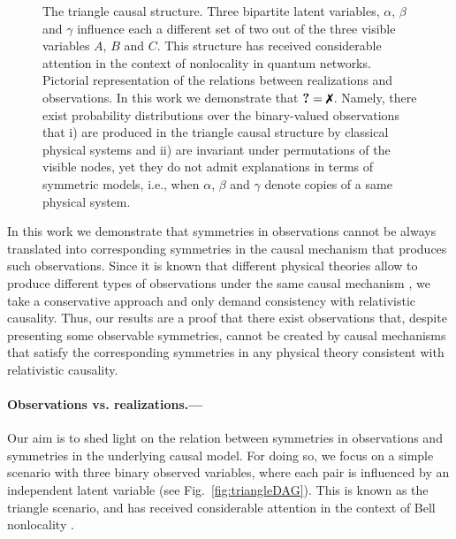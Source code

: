 \documentclass[aps,physrev,reprint,superscriptaddress,nofootinbib,twocolumn]{revtex4-2}
\newcommand{\vmark}{\text{\ding{51}}}
\newcommand{\xmark}{\text{\ding{55}}}
\begin{document}
\begin{figure}
{{
        }
    }
    \caption{
        \protect{} The triangle causal structure.
        Three bipartite latent variables, $\alpha$, $\beta$ and $\gamma$ influence each a different set of two out of the three visible variables $A$, $B$ and $C$.
        This structure has received considerable attention in the context of nonlocality in quantum networks.
        \protect{} Pictorial representation of the relations between realizations and observations.
        In this work we demonstrate that $\textbf{?}=\xmark$.
        Namely, there exist probability distributions over the binary-valued observations that i) are produced in the triangle causal structure by classical physical systems and ii) are invariant under permutations of the visible nodes, yet they do not admit explanations in terms of symmetric models, i.e., when $\alpha$, $\beta$ and $\gamma$ denote copies of a same physical system. 
        }
    \label{fig:intro}
\end{figure}

In this work we demonstrate that symmetries in observations cannot be always translated into corresponding symmetries in the causal mechanism that produces such observations.
Since it is known that different physical theories allow to produce different types of observations under the same causal mechanism \cite{bell1964}, we take a conservative approach and only demand consistency with relativistic causality.
Thus, our results are a proof that there exist observations that, despite presenting some observable symmetries, cannot be created by causal mechanisms that satisfy the corresponding symmetries in any physical theory consistent with relativistic causality.

\paragraph*{Observations vs. realizations.---}
Our aim is to shed light on the relation between symmetries in observations and symmetries in the underlying causal model.
For doing so, we focus on a simple scenario with three binary observed variables, where each pair is influenced by an independent latent variable (see Fig.~\ref{fig:triangleDAG}).
This is known as the triangle scenario, and has received considerable attention in the context of Bell nonlocality \cite{TavakoliPozas2022,fritz2012,renou2019,fraser2018,gisin2020,pozas2023}.
\end{document}
